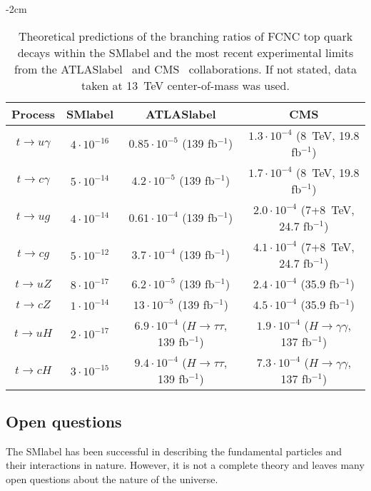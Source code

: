 \begin{table}[htbp]
    \addtolength{\leftskip} {-2cm} %
    \addtolength{\rightskip}{-2cm}
    \begin{tabular}{c|c|cc}
    \toprule\toprule
    Process & \acrshort{SMlabel} & \acrshort{ATLASlabel} & CMS \\ \midrule
    $t\to u\gamma$  & $4\cdot 10^{-16}$ &  $0.85\cdot 10^{-5}$ (139 fb$^{-1}$)  & $1.3\cdot 10^{-4}$ (8~TeV, 19.8 fb$^{-1}$) \\ 
    $t\to c\gamma$  & $5\cdot 10^{-14}$ &  $4.2\cdot 10^{-5}$ (139 fb$^{-1}$)  & $1.7\cdot 10^{-4}$ (8~TeV, 19.8 fb$^{-1}$) \\ \midrule
    $t\to ug$  & $4\cdot 10^{-14}$ &  $0.61\cdot 10^{-4}$ (139 fb$^{-1}$)  & $2.0\cdot 10^{-4}$ (7+8~TeV, 24.7 fb$^{-1}$) \\ 
    $t\to cg$  & $5\cdot 10^{-12}$ &  $3.7\cdot 10^{-4}$ (139 fb$^{-1}$)  & $4.1\cdot 10^{-4}$ (7+8~TeV, 24.7 fb$^{-1}$) \\ \midrule
    $t\to uZ$  & $8\cdot 10^{-17}$ &  $6.2\cdot 10^{-5}$ (139 fb$^{-1}$)  & $2.4\cdot 10^{-4}$ (35.9 fb$^{-1}$) \\ 
    $t\to cZ$  & $1\cdot 10^{-14}$ &  $13\cdot 10^{-5}$ (139 fb$^{-1}$)  & $4.5\cdot 10^{-4}$ (35.9 fb$^{-1}$) \\ \midrule
    $t\to uH$  & $2\cdot 10^{-17}$ &  $6.9\cdot 10^{-4}$ ($H\to\tau\tau$, 139 fb$^{-1}$) & $1.9\cdot 10^{-4}$ ($H\to\gamma\gamma$, 137 fb$^{-1}$) \\ 
    $t\to cH$  & $3\cdot 10^{-15}$ &  $9.4\cdot 10^{-4}$ ($H\to\tau\tau$, 139 fb$^{-1}$) & $7.3\cdot 10^{-4}$ ($H\to\gamma\gamma$, 137 fb$^{-1}$) \\ \midrule
    \bottomrule\bottomrule
    \end{tabular}
    \caption{Theoretical predictions of the branching ratios of FCNC top quark decays within the \acrshort{SMlabel} \cite{SMFCNC} and the most recent experimental limits from the \acrshort{ATLASlabel}~\cite{ATLAStqgamma,ATLAStqg,ATLAStqHtautau} and CMS~\cite{CMStqgamma,CMStqg,CMStqZ,CMStqHgammagamma} collaborations. If not stated, data taken at 13~TeV center-of-mass was used.}
    \label{tabSM:FCNCmeasurements}
    \end{table}

\subsection{Open questions}
\label{subsec:openquestions}

The \acrshort{SMlabel} has been successful in describing the fundamental particles and their interactions in nature. However, it is not a complete theory and leaves many open questions about the nature of the universe.\\

